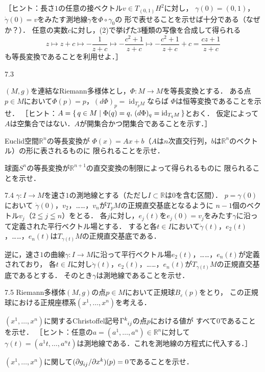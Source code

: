 \documentclass[uplatex,dvipdfmx,fontsize=12pt,jafontsize=11pt,line_length=42zw,number_of_lines=36,hanging_punctuation]{jlreq}
\newcommand{\compose}{\mathbin{\circ}}
\DeclareMathOperator{\id}{id}
\begin{document}
\begin{enumerate-problems}
\begin{enumerate-subproblems}
				［ヒント：長さ$1$の任意の接ベクトル$v\in T_{(0,1)}H^2$に対し，
				$\gamma(0)=(0,1)$，$\dot{\gamma}(0)=v$をみたす測地線$\gamma$を$\Phi\compose\gamma_0$の
				形で表せることを示せば十分である（なぜか？）．
				任意の実数$c$に対し，(2)で挙げた3種類の写像を合成して得られる
				\begin{equation}
					z\mapsto z+c
					\mapsto -\frac{1}{z+c}
					\mapsto -\frac{c^2+1}{z+c}
					\mapsto -\frac{c^2+1}{z+c}+c=\frac{cz+1}{z+c}
				\end{equation}
				も等長変換であることを利用せよ．］
		\end{enumerate-subproblems}
		\clearpage
	\item[7.3]\phantom{}
		\begin{enumerate-subproblems}
			\item\vspace{-\baselineskip}
				$(M,g)$を連結なRiemann多様体とし，$\Phi\colon M\to M$を等長変換とする．
				ある点$p\in M$において$\Phi(p)=p$，$(d\Phi)_p=\id_{T_pM}$ならば
				$\Phi$は恒等変換であることを示せ．
				［ヒント：$A=\set{q\in M|\Phi(q)=q,\,(d\Phi)_q=\id_{T_qM}}$とおく．
				仮定によって$A$は空集合ではない．$A$が開集合かつ閉集合であることを示す．］
			\item
				Euclid空間$\mathbb{R}^n$の等長変換が
				$\Phi(x)=Ax+b$（$A$は$n$次直交行列，$b$は$\mathbb{R}^n$のベクトル）の形に表されるものに
				限られることを示せ．
			\item
				球面$S^n$の等長変換が$\mathbb{R}^{n+1}$の直交変換の制限によって得られるものに
				限られることを示せ．
		\end{enumerate-subproblems}
	\item[7.4]
		$\gamma\colon I\to M$を速さ$1$の測地線とする（ただし$I\subset\mathbb{R}$は$0$を含む区間）．
		$p=\gamma(0)$において
		$\dot{\gamma}(0)$，$v_2$，……，$v_n$が$T_pM$の正規直交基底となるように
		$n-1$個のベクトル$v_j$（$2\leqq j\leqq n$）をとる．
		各$j$に対し，$e_j(t)$を$e_j(0)=v_j$をみたす$\gamma$に沿って定義された平行ベクトル場とする．
		すると各$t\in I$において$\dot{\gamma}(t)$，$e_2(t)$，……，$e_n(t)$は$T_{\gamma(t)}M$の正規直交基底である．

		逆に，速さ$1$の曲線$\gamma\colon I\to M$に沿って平行ベクトル場$e_2(t)$，……，$e_n(t)$が定義されており，
		各$t\in I$に対し$\dot{\gamma}(t)$，$e_2(t)$，……，$e_n(t)$が$T_{\gamma(t)}M$の正規直交基底であるとする．
		そのとき$\gamma$は測地線であることを示せ．
	\item[7.5]
		Riemann多様体$(M,g)$の点$p\in M$において正規球$B_\varepsilon(p)$をとり，
		この正規球における正規座標系$(x^1,\dots,x^n)$を考える．
		\begin{enumerate-subproblems}
			\item
				$(x^1,\dots,x^n)$に関するChristoffel記号$\tensor{\Gamma}{^k_i_j}$の点$p$における値が
				すべて$0$であることを示せ．
				［ヒント：任意の$a=(a^1,\dots,a^n)\in\mathbb{R}^n$に対して
				$\gamma(t)=(a^1t,\dots,a^nt)$は測地線である．これを測地線の方程式に代入する．］
			\item
				$(x^1,\dots,x^n)$に関して$(\partial\tensor{g}{_i_j}/\partial x^k)(p)=0$であることを示せ．
		\end{enumerate-subproblems}


\end{enumerate-problems}
\end{document}
